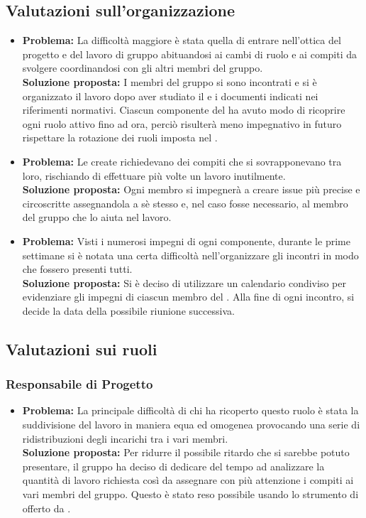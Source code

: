 \subsection{Valutazioni sull'organizzazione}
\begin{itemize}
	\item \textbf{Problema:} La difficoltà maggiore è stata quella di entrare nell'ottica del progetto e del lavoro di gruppo abituandosi ai cambi di ruolo e ai compiti da svolgere coordinandosi con gli altri membri del gruppo.\\
	\textbf{Soluzione proposta:} I membri del gruppo si sono incontrati e si è organizzato il lavoro dopo aver studiato il  e i documenti indicati nei riferimenti normativi. Ciascun componente del  ha avuto modo di ricoprire ogni ruolo attivo fino ad ora, perciò risulterà meno impegnativo in futuro rispettare la rotazione dei ruoli imposta nel \textit{}.
	\item \textbf{Problema:} Le  create richiedevano dei compiti che si sovrapponevano tra loro, rischiando di effettuare più volte un lavoro inutilmente.\\
	\textbf{Soluzione proposta:} Ogni membro si impegnerà a creare issue più precise e circoscritte assegnandola a sè stesso e, nel caso fosse necessario, al membro del gruppo che lo aiuta nel lavoro.
	\item \textbf{Problema:} Visti i numerosi impegni di ogni componente, durante le prime settimane si è notata una certa difficoltà nell'organizzare gli incontri in modo che fossero presenti tutti.\\
	\textbf{Soluzione proposta:} Si è deciso di utilizzare un calendario condiviso per evidenziare gli impegni di ciascun membro del . Alla fine di ogni incontro, si decide la data della possibile riunione successiva.
\end{itemize}

\subsection{Valutazioni sui ruoli}
\subsubsection{Responsabile di Progetto}
\begin{itemize}
	\item \textbf{Problema:} La principale difficoltà di chi ha ricoperto questo ruolo è stata la suddivisione del lavoro in maniera equa ed omogenea provocando una serie di ridistribuzioni degli incarichi tra i vari membri.\\
	\textbf{Soluzione proposta:} Per ridurre il possibile ritardo che si sarebbe potuto presentare, il gruppo ha deciso di dedicare del tempo ad analizzare la quantità di lavoro richiesta così da assegnare con più attenzione i compiti ai vari membri del gruppo. Questo è stato reso possibile usando lo strumento di  offerto da .
\end{itemize}

